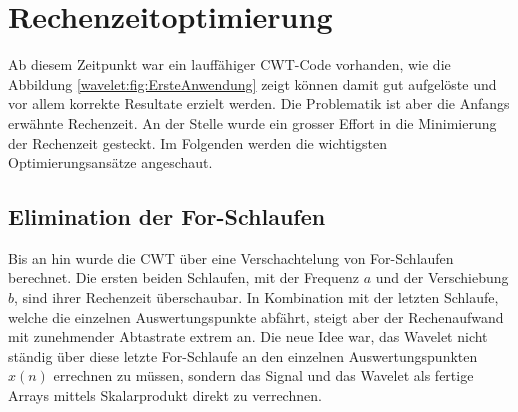 %
%
%
%
\section{Rechenzeitoptimierung
\label{wavelets:section:teil3}}
Ab diesem Zeitpunkt war ein lauffähiger CWT-Code vorhanden, wie die Abbildung \ref{wavelet:fig:ErsteAnwendung} zeigt können damit gut aufgelöste und vor allem korrekte Resultate erzielt werden. Die Problematik ist aber die Anfangs erwähnte Rechenzeit. An der Stelle wurde ein grosser Effort in die Minimierung der Rechenzeit gesteckt. Im Folgenden werden die wichtigsten Optimierungsansätze angeschaut.



\subsection{Elimination der For-Schlaufen
	\label{wavelets:subsection:EliminationForSchlaufen}}
Bis an hin wurde die CWT über eine Verschachtelung von For-Schlaufen berechnet. Die ersten beiden Schlaufen, mit der Frequenz $a$ und der Verschiebung $b$, sind ihrer Rechenzeit überschaubar.
In Kombination mit der letzten Schlaufe, welche die einzelnen Auswertungspunkte abfährt, steigt aber der Rechenaufwand mit zunehmender Abtastrate extrem an.
Die neue Idee war, das Wavelet nicht ständig über diese letzte For-Schlaufe an den einzelnen Auswertungspunkten $x(n)$ errechnen zu müssen, sondern das Signal und das Wavelet als fertige Arrays mittels Skalarprodukt direkt zu verrechnen.

